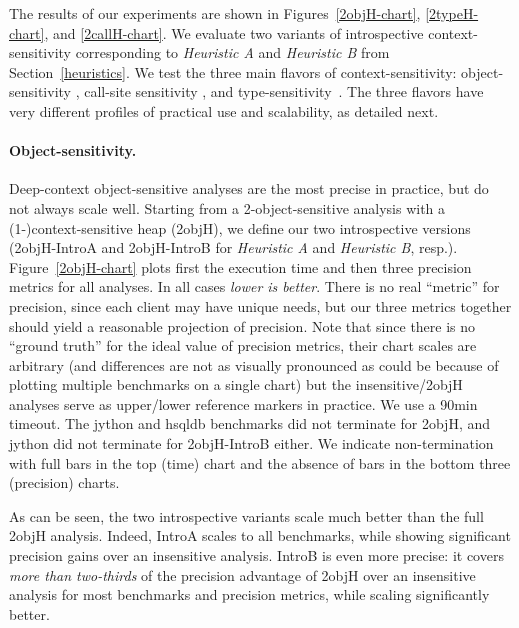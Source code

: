 The results of our experiments are shown in Figures~\ref{2objH-chart},
\ref{2typeH-chart}, and \ref{2callH-chart}. We evaluate two variants
of introspective context-sensitivity corresponding to \emph{Heuristic
  A} and \emph{Heuristic B} from Section~\ref{heuristics}. We test the
three main flavors of context-sensitivity: object-sensitivity
\cite{Milanova:2002:POS:566172.566174,1044835}, call-site sensitivity
\cite{Sharir:Interprocedural,Shivers:1991:diss}, and
type-sensitivity~\cite{pointsto-popl11}. The three flavors have very
different profiles of practical use and scalability, as detailed next.

\paragraph{Object-sensitivity.}
Deep-context object-sensitive analyses are the most precise in
practice, but do not always scale well. Starting from a
2-object-sensitive analysis with a (1-)context-sensitive heap (2objH),
we define our two introspective versions (2objH-IntroA and
2objH-IntroB for \emph{Heuristic A} and \emph{Heuristic B},
resp.). Figure~\ref{2objH-chart} plots first the execution time and
then three precision metrics for all analyses.
In all cases \emph{lower is better}. There is no real ``metric'' for
precision, since each client may have unique needs, but our three
metrics together should yield a reasonable projection of
precision. Note that since there is no ``ground truth'' for the ideal
value of precision metrics, their chart scales are arbitrary (and
differences are not as visually pronounced as could be because of
plotting multiple benchmarks on a single chart) but the
insensitive/2objH analyses serve as upper/lower reference markers in
practice. We use a 90min timeout. The jython and hsqldb benchmarks did
not terminate for 2objH, and jython did not terminate for 2objH-IntroB
either. We indicate non-termination with full bars in the top (time)
chart and the absence of bars in the bottom three (precision) charts.

As can be seen, the two introspective variants scale much better than
the full 2objH analysis. Indeed, IntroA scales to all benchmarks,
while showing significant precision gains over an insensitive
analysis. IntroB is even more precise: it covers \emph{more than
  two-thirds} of the precision advantage of 2objH over an insensitive
analysis for most benchmarks and precision metrics, while scaling
significantly better.



